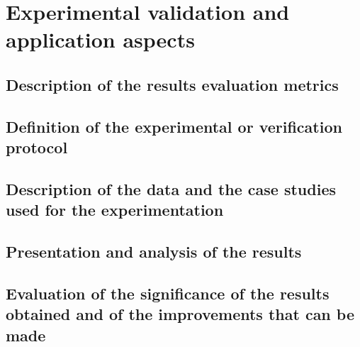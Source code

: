 \chapter{Experimental validation and application aspects}
\section{Description of the results evaluation metrics}
\section{Definition of the experimental or verification protocol}
\section{Description of the data and the case studies used for the experimentation}
\section{Presentation and analysis of the results}
\section{Evaluation of the significance of the results obtained and of the improvements that can be made}